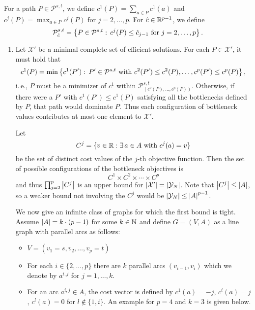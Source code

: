 \documentclass[11pt,a4paper,parskip=half-]{scrartcl}
\begin{document}
\begin{solution}
  For a path $P \in \mathcal P^{s,t}$, we define $c^1(P) = \sum_{a \in P} c^1(a)$
  and $c^j(P) = \max_{a \in P} c^j(P)$ for $j=2,\dotsc,p$. For
  $\hat c \in \mathbb{R}^{p-1}$, we define 
  \[\mathcal P^{s,t}_{\hat c} = \left\{ P \in \mathcal P^{s,t}:\,
  c^j(P) \leq \hat c_{j-1} \text{ for }j=2,\dotsc,p\right\} \text{.}\]
  \begin{enumerate}
	  \item Let $\mathcal X'$ be a minimal complete set of efficient solutions.
	  For each
	  $P \in \mathcal X'$, it must hold that
	  \[c^1(P) = \min\left\{c^1(P'):\,
	  P' \in \mathcal P^{s,t}\text{ with }c^2(P') \leq c^2(P), \dotsc,
	  c^p(P') \leq c^p(P)\right\}\text{,}\]
	  i.\,e., $P$ must be a minimizer of $c^1$ within $\mathcal P^{s,t}_{(c^2(P),\dotsc,c^p(P))}$. Otherwise, if there were a $P'$ with $c^1(P') \leq c^1(P)$ satisfying
	  all the bottlenecks defined by $P$, that path would dominate $P$. Thus
	  each configuration of bottleneck values contributes at most one element
	  to $\mathcal X'$.
	  
	  Let \[C^j = \{ v \in \mathbb{R}: \exists\, a \in A\text{ with } c^j(a) = v\}\]
	  be the set of distinct cost values of the $j$-th objective function. Then
	  the set of possible configurations of the bottleneck objectives is
	\[ C^1 \times C^2 \times \dotsm \times C^p \]
	and thus $\prod_{j=2}^p \left\lvert C^j \right\rvert$ is an upper bound for $\left\lvert \mathcal X' \right\rvert
	= \left\lvert \mathcal Y_N \right\rvert$. Note
	that $\left\lvert C^j \right\rvert \leq \left\lvert A \right\rvert$, so a weaker bound not involving the $C^j$ would
	be $\left\lvert \mathcal Y_N \right\rvert \leq {\left\lvert A \right\rvert}^{p-1}$.
	
  We now give an infinite class of graphs for which the first bound is tight.
  Assume $\left\lvert A \right\rvert = k\cdot (p-1)$ for some $k \in \mathbb{N}$ and define 
  $G = (V,A)$ as a line graph with parallel arcs as follows:
  \begin{itemize}
		\item $V = (v_1 = s, v_2, \dotsc,  v_p = t)$
	  \item For each $i \in \{2,\dotsc,p\}$ there are $k$ parallel arcs $(v_{i-1},v_i)$ which we denote by $ a^{i,j}$ for $j=1,\dotsc,k$.
	  \item For an arc $a^{i,j} \in A$, the cost vector is defined by
	  $c^1(a) = -j$, $c^i(a) = j$, $c^l(a) = 0$ for $l \notin \{1,i\}$.
	  An example for $p=4$ and $k=3$ is given below.
  \end{itemize}
	\begin{center}
\end{center}
\end{enumerate}
\end{solution}
\end{document}
